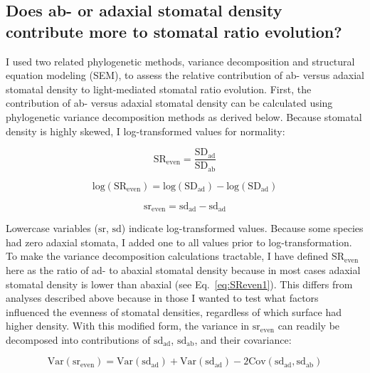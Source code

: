\documentclass[12pt, oneside]{article}
\begin{document}
\subsection*{Does ab- or adaxial stomatal density contribute more to stomatal ratio evolution?}

I used two related phylogenetic methods, variance decomposition and structural equation modeling (SEM), to assess the relative contribution of ab- versus adaxial stomatal density to light-mediated stomatal ratio evolution. First, the contribution of ab- versus adaxial stomatal density can be calculated using phylogenetic variance decomposition methods as derived below. Because stomatal density is highly skewed, I log-transformed values for normality:
 
\begin{equation} \label{eq:SReven2} 
  \mathrm{SR_{even}} = \frac{\mathrm{SD_{ad}}}{\mathrm{SD_{ab}}}
\end{equation}

\begin{equation} \label{eq:logSReven} 
  \mathrm{log(SR_{even})} = \mathrm{log(SD_{ad})} - \mathrm{log(SD_{ad})}
\end{equation}

\begin{equation} \label{eq:SReven3} 
  \mathrm{sr_{even}} = \mathrm{sd_{ad}} - \mathrm{sd_{ad}}
\end{equation}

Lowercase variables ($\mathrm{sr}$, $\mathrm{sd}$) indicate log-transformed values. Because some species had zero adaxial stomata, I added one to all values prior to log-transformation. To make the variance decomposition calculations tractable, I have defined $\mathrm{SR_{even}}$ here as the ratio of ad- to abaxial stomatal density because in most cases adaxial stomatal density is lower than abaxial (see Eq.~\ref{eq:SReven1}). This differs from analyses described above because in those I wanted to test what factors influenced the evenness of stomatal densities, regardless of which surface had higher density. With this modified form, the variance in $\mathrm{sr_{even}}$ can readily be decomposed into contributions of $\mathrm{sd_{ad}}$, $\mathrm{sd_{ab}}$, and their covariance:

\begin{equation} \label{eq:varDecomp}
	\mathrm{Var(sr_{even})} = \mathrm{Var(sd_{ad})} + \mathrm{Var(sd_{ad})} - 2 \mathrm{Cov(sd_{ad}, sd_{ab})}
\end{equation}
\end{document}
